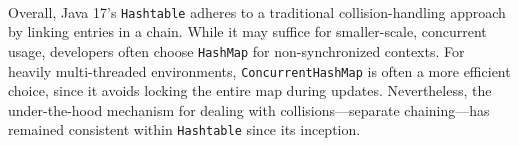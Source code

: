 \documentclass[12pt]{article}
\begin{document}
	\paragraph{}Overall, Java 17’s \texttt{Hashtable} adheres to a traditional collision-handling approach by linking entries in a chain. While it may suffice for smaller-scale, concurrent usage, developers often choose \texttt{HashMap} for non-synchronized contexts. For heavily multi-threaded environments, \texttt{ConcurrentHashMap} is often a more efficient choice, since it avoids locking the entire map during updates. Nevertheless, the under-the-hood mechanism for dealing with collisions—separate chaining—has remained consistent within \texttt{Hashtable} since its inception.
\end{document}
